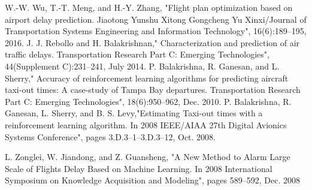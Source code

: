 \documentclass[conference]{IEEEtran}
\begin{document}
\begin{thebibliography}{00}
\label{[12]}W.-W. Wu, T.-T. Meng, and H.-Y. Zhang, "Flight plan optimization based on airport delay prediction. Jiaotong Yunshu Xitong Gongcheng Yu Xinxi/Journal of Transportation Systems Engineering and Information Technology", 16(6):189–195, 2016.
\label{[13]}J. J. Rebollo and H. Balakrishnan," Characterization and prediction of air traffic delays. Transportation Research Part C: Emerging Technologies", 44(Supplement C):231–241, July 2014. 
\label{[14]}P. Balakrishna, R. Ganesan, and L. Sherry," Accuracy of reinforcement learning algorithms for predicting aircraft taxi-out times: A case-study of Tampa Bay departures. Transportation Research Part C: Emerging Technologies", 18(6):950–962, Dec. 2010.
\label{[15]}P. Balakrishna, R. Ganesan, L. Sherry, and B. S. Levy,"Estimating Taxi-out times with a reinforcement learning algorithm. In 2008 IEEE/AIAA 27th Digital Avionics Systems Conference", pages 3.D.3–1–3.D.3–12, Oct. 2008.

\label{[16]}L. Zonglei, W. Jiandong, and Z. Guansheng, "A New Method to Alarm Large Scale of Flights Delay Based on Machine Learning. In 2008 International Symposium on Knowledge Acquisition and Modeling", pages 589–592, Dec. 2008
\end{thebibliography} 
\endgroup 
\end{document}
